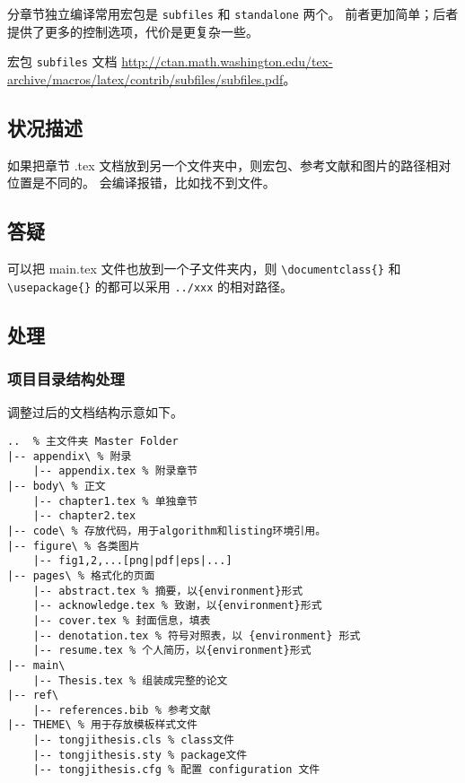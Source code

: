 \documentclass[../Main/thesis.tex]{subfiles}
\begin{document}
分章节独立编译常用宏包是 \texttt{subfiles} 和 \texttt{standalone} 两个。
前者更加简单；后者提供了更多的控制选项，代价是更复杂一些。

宏包 \texttt{subfiles} 文档
\url{http://ctan.math.washington.edu/tex-archive/macros/latex/contrib/subfiles/subfiles.pdf}。

\subsection{状况描述}

如果把章节 .tex 文档放到另一个文件夹中，则宏包、参考文献和图片的路径相对位置是不同的。
会编译报错，比如找不到文件。

\subsection{答疑}

可以把 main.tex 文件也放到一个子文件夹内，则 \texttt{\textbackslash{}documentclass\{\}} 和 \texttt{\textbackslash{}usepackage\{\}} 的都可以采用 \texttt{../xxx} 的相对路径。

\subsection{处理}

\subsubsection{项目目录结构处理}

调整过后的文档结构示意如下。

\begin{verbatim}
..  % 主文件夹 Master Folder
|-- appendix\ % 附录
    |-- appendix.tex % 附录章节
|-- body\ % 正文
    |-- chapter1.tex % 单独章节
    |-- chapter2.tex
|-- code\ % 存放代码，用于algorithm和listing环境引用。
|-- figure\ % 各类图片
    |-- fig1,2,...[png|pdf|eps|...]
|-- pages\ % 格式化的页面
    |-- abstract.tex % 摘要，以{environment}形式
    |-- acknowledge.tex % 致谢，以{environment}形式
    |-- cover.tex % 封面信息，填表
    |-- denotation.tex % 符号对照表，以 {environment} 形式
    |-- resume.tex % 个人简历，以{environment}形式
|-- main\
    |-- Thesis.tex % 组装成完整的论文
|-- ref\
    |-- references.bib % 参考文献
|-- THEME\ % 用于存放模板样式文件
    |-- tongjithesis.cls % class文件
    |-- tongjithesis.sty % package文件
    |-- tongjithesis.cfg % 配置 configuration 文件
\end{verbatim}
\end{document}
